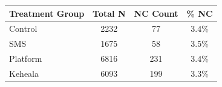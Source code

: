\begin{tabular}{lccc}
\hline
Treatment Group & Total N & NC Count & \% NC \\
\hline
Control & 2232 & 77 & 3.4\% \\
SMS & 1675 & 58 & 3.5\% \\
Platform & 6816 & 231 & 3.4\% \\
Keheala & 6093 & 199 & 3.3\% \\
\hline
\end{tabular}